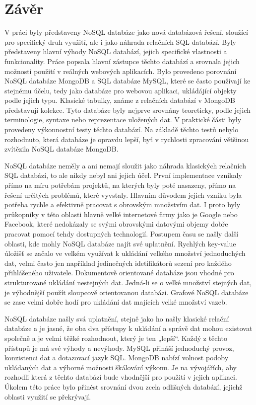 
\chapter{Závěr}
V práci byly představeny NoSQL databáze jako nová databázová řešení, sloužící pro specifický druh využití, ale i jako náhrada relačních SQL databází. Byly představeny hlavní výhody NoSQL databází, jejich specifické vlastnosti a funkcionality. Práce popsala hlavní zástupce těchto databází a srovnala jejich možnosti použití v reálných webových aplikacích. Bylo provedeno porovnání NoSQL databáze MongoDB a SQL databáze MySQL, které se často používají ke stejnému účelu, tedy jako databáze pro webovou aplikaci, ukládájící objekty podle jejich typu. Klasické tabulky, známe z relačních databází v MongoDB představují kolekce. Tyto databáze byly nejprve srovnány teoreticky, podle jejich terminologie, syntaxe nebo reprezentace uložených dat. V praktické části byly provedeny výkonnostní testy těchto databází. Na základě těchto testů nebylo rozhodnuto, která databáze je opravdu lepší, byť v rychlosti zpracování většinou zvítězila NoSQL databáze MongoDB. 

NoSQL databáze neměly a ani nemají sloužit jako náhrada klasických relačních SQL databází, to ale nikdy nebyl ani jejich účel. První implementace vznikaly přímo na míru potřebám projektů, na kterých byly poté nasazeny, přímo na řešení určitých problémů, které vyvstaly. Hlavním důvodem jejich vzniku byla potřeba rychle a efektivně pracovat s obrovským množstvím dat. I proto byly průkopníky v této oblasti hlavně velké internetové firmy jako je Google nebo Facebook, které nedokázaly se svými obrovskými datovými objemy dobře pracovat pomocí tehdy dostupných technologií. Postupem času se našly další oblasti, kde  mohly NoSQL databáze najít své uplatnění. Rychlých key-value úložišť se začalo ve velkém využívat k ukládání velkého množství jednoduchých dat, velmi často jen například jedinečných idetifikátorů sezení pro každého přihlášeného uživatele. Dokumentově orientované databáze jsou vhodné pro strukturované ukládání nestejných dat. Jedná-li se o velké množství stejných dat, je výhodnější použít sloupcově orientovanou databázi. Grafové NoSQL databáze se zase velmi dobře hodí pro ukládání dat majících velké množství vazeb.

NoSQL databáze našly svá uplatnění, stejně jako ho našly klasické relační databáze a je jasné, že oba dva přístupy k ukládání a správě dat mohou existovat společně a je velmi těžké rozhodnout, který je ten „lepší“. Každý z těchto přístupů je má své výhody a nevýhody. MySQL přináší jednoduchý provoz, konzistenci dat a dotazovací jazyk SQL. MongoDB nabízí volnost podoby ukládaných dat a výborné možnosti škálování výkonu. Je na vývojářích, aby rozhodli která z těchto databází bude vhodnější pro použití v jejich aplikaci. Úkolem této práce bylo přinést srovnání dvou zcela odlišných databází, jejichž oblasti využití se překrývají.  

